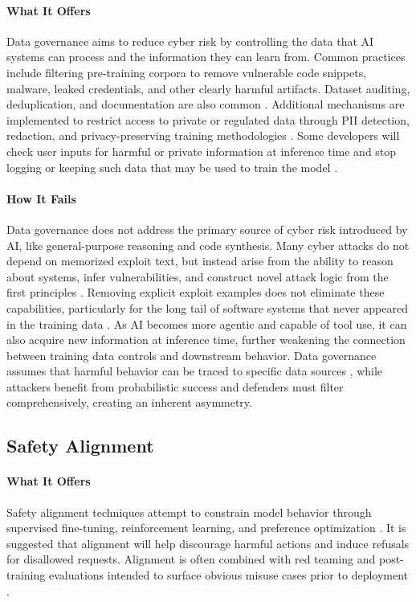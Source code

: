 \documentclass{article}
\theoremstyle{plain}
\theoremstyle{definition}
\theoremstyle{remark}
\begin{document}
\paragraph{What It Offers}
Data governance aims to reduce cyber risk by controlling the data that AI systems can process and the information they can learn from. Common practices include filtering pre-training corpora to remove vulnerable code snippets, malware, leaked credentials, and other clearly harmful artifacts. Dataset auditing, deduplication, and documentation are also common \citep{bengio2024managing}. Additional mechanisms are implemented to restrict access to private or regulated data through PII detection, redaction, and privacy-preserving training methodologies \citep{feretzakis2024privacy}. Some developers will check user inputs for harmful or private information at inference time and stop logging or keeping such data that may be used to train the model \citep{dainotti2012analysis}.


\paragraph{How It Fails}
Data governance does not address the primary source of cyber risk introduced by AI, like general-purpose reasoning and code synthesis. Many cyber attacks do not depend on memorized exploit text, but instead arise from the ability to reason about systems, infer vulnerabilities, and construct novel attack logic from the first principles \citep{zhu2024teams}. Removing explicit exploit examples does not eliminate these capabilities, particularly for the long tail of software systems that never appeared in the training data \citep{carlini2025llms}. As AI becomes more agentic and capable of tool use, it can also acquire new information at inference time, further weakening the connection between training data controls and downstream behavior. Data governance assumes that harmful behavior can be traced to specific data sources \citep{janssen2020data}, while attackers benefit from probabilistic success and defenders must filter comprehensively, creating an inherent asymmetry.

\subsection{Safety Alignment}
\label{safety_alignment}
\paragraph{What It Offers}
Safety alignment techniques attempt to constrain model behavior through supervised fine-tuning, reinforcement learning, and preference optimization \citep{mu2024rule, openai_superalignment}. It is suggested that alignment will help discourage harmful actions and induce refusals for disallowed requests. Alignment is often combined with red teaming and post-training evaluations intended to surface obvious misuse cases prior to deployment \citep{ji2025ai}.
\end{document}
